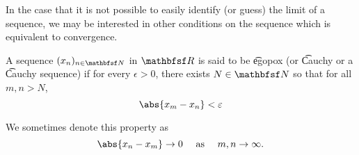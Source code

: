 

In the case that it is not possible to easily identify (or guess) the limit of a sequence, we may be interested in other conditions on the sequence which is equivalent to convergence.


A sequence $(x_n)_{n \in \N}$ in $\R$ is said to be \t{egopox} (or \t{Cauchy} or a \t{Cauchy sequence}) if for every $\epsilon > 0$, there exists $N \in \N$ so that for all $m, n > N$,
\[
  \abs{x_m - x_n} < \epsilon
\]


We sometimes denote this property as
\[
    \abs{x_n - x_m} \to 0 \quad \text{ as } \quad m, n \to \infty.
\]

\blankpage
